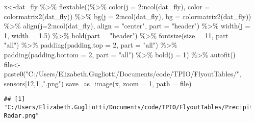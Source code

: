 \documentclass[
]{article}
\newenvironment{Shaded}{\begin{snugshade}}{\end{snugshade}}
\newcommand{\AttributeTok}[1]{\textcolor[rgb]{0.77,0.63,0.00}{#1}}
\newcommand{\DecValTok}[1]{\textcolor[rgb]{0.00,0.00,0.81}{#1}}
\newcommand{\FloatTok}[1]{\textcolor[rgb]{0.00,0.00,0.81}{#1}}
\newcommand{\FunctionTok}[1]{\textcolor[rgb]{0.00,0.00,0.00}{#1}}
\newcommand{\NormalTok}[1]{#1}
\newcommand{\OtherTok}[1]{\textcolor[rgb]{0.56,0.35,0.01}{#1}}
\newcommand{\SpecialCharTok}[1]{\textcolor[rgb]{0.00,0.00,0.00}{#1}}
\newcommand{\StringTok}[1]{\textcolor[rgb]{0.31,0.60,0.02}{#1}}
\begin{document}
\begin{Shaded}
\begin{Highlighting}[]
\NormalTok{x}\OtherTok{\textless{}{-}}\NormalTok{dat\_fly }\SpecialCharTok{\%\textgreater{}\%}
    \FunctionTok{flextable}\NormalTok{()}\SpecialCharTok{\%\textgreater{}\%}
    \FunctionTok{color}\NormalTok{(}\AttributeTok{j =} \DecValTok{2}\SpecialCharTok{:}\FunctionTok{ncol}\NormalTok{(dat\_fly), }\AttributeTok{color =} \FunctionTok{colormatrix2}\NormalTok{(dat\_fly)) }\SpecialCharTok{\%\textgreater{}\%}
    \FunctionTok{bg}\NormalTok{(}\AttributeTok{j =} \DecValTok{2}\SpecialCharTok{:}\FunctionTok{ncol}\NormalTok{(dat\_fly), }\AttributeTok{bg =} \FunctionTok{colormatrix2}\NormalTok{(dat\_fly)) }\SpecialCharTok{\%\textgreater{}\%}
    \FunctionTok{align}\NormalTok{(}\AttributeTok{j=}\DecValTok{2}\SpecialCharTok{:}\FunctionTok{ncol}\NormalTok{(dat\_fly), }\AttributeTok{align =} \StringTok{"center"}\NormalTok{, }\AttributeTok{part =} \StringTok{"header"}\NormalTok{) }\SpecialCharTok{\%\textgreater{}\%}
    \FunctionTok{width}\NormalTok{(}\AttributeTok{j =} \DecValTok{1}\NormalTok{, }\AttributeTok{width =} \FloatTok{1.5}\NormalTok{) }\SpecialCharTok{\%\textgreater{}\%}
    \FunctionTok{bold}\NormalTok{(}\AttributeTok{part =} \StringTok{"header"}\NormalTok{) }\SpecialCharTok{\%\textgreater{}\%}
    \FunctionTok{fontsize}\NormalTok{(}\AttributeTok{size =} \DecValTok{11}\NormalTok{, }\AttributeTok{part =} \StringTok{"all"}\NormalTok{) }\SpecialCharTok{\%\textgreater{}\%}
    \FunctionTok{padding}\NormalTok{(}\AttributeTok{padding.top =} \DecValTok{2}\NormalTok{, }\AttributeTok{part =} \StringTok{"all"}\NormalTok{) }\SpecialCharTok{\%\textgreater{}\%}
    \FunctionTok{padding}\NormalTok{(}\AttributeTok{padding.bottom =} \DecValTok{2}\NormalTok{, }\AttributeTok{part =} \StringTok{"all"}\NormalTok{) }\SpecialCharTok{\%\textgreater{}\%}
    \FunctionTok{bold}\NormalTok{(}\AttributeTok{j =} \DecValTok{1}\NormalTok{) }\SpecialCharTok{\%\textgreater{}\%} \FunctionTok{autofit}\NormalTok{()}
\NormalTok{file}\OtherTok{\textless{}{-}}\FunctionTok{paste0}\NormalTok{(}\StringTok{"C:/Users/Elizabeth.Gugliotti/Documents/code/TPIO/FlyoutTables/"}\NormalTok{, sensors[}\DecValTok{12}\NormalTok{,}\DecValTok{1}\NormalTok{],}\StringTok{".png"}\NormalTok{)}
\FunctionTok{save\_as\_image}\NormalTok{(x, }\AttributeTok{zoom =} \DecValTok{1}\NormalTok{, }\AttributeTok{path =}\NormalTok{ file)}
\end{Highlighting}
\end{Shaded}

\begin{verbatim}
## [1] "C:/Users/Elizabeth.Gugliotti/Documents/code/TPIO/FlyoutTables/Precipitation Radar.png"
\end{verbatim}
\end{document}

